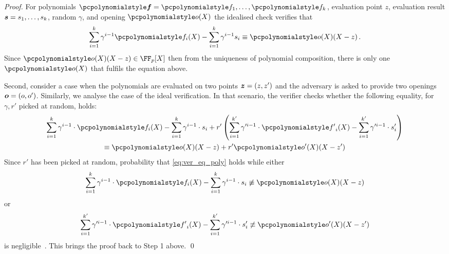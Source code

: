 \documentclass[runningheads,11pt]{llncs}
\let\spvec\vec
\let\vec\accentvec
\let\spvec\vec
\let\vec\spvec
\def\vec#1{\mathchoice{\mbox{\boldmath$\displaystyle#1$}}
  {\mbox{\boldmath$\textstyle#1$}} {\mbox{\boldmath$\scriptstyle#1$}}
  {\mbox{\boldmath$\scriptscriptstyle#1$}}}
\begin{document}
\begin{proof}
For polynomials $\vec{\p{f}} = \p{f}_1, \ldots, \p{f}_k$, evaluation point $z$, evaluation
result $\vec{s} = s_1, \ldots, s_k$, random $\gamma$, and opening $\p{o}(X)$ the
idealised check verifies that
\begin{equation}
	\sum_{i = 1}^k \gamma^{i - 1} \p{f}_i(X) - \sum_{i = 1}^{k} \gamma^{i - 1} s_i \equiv \p{o}(X) (X - z)\,.
	\label{eq:pcom_idealised_check}
\end{equation}
Since $\p{o}(X)(X - z) \in \FF_p[X]$ then from the uniqueness of polynomial
composition, there is only one $\p{o} (X)$ that fulfils the equation above.

 Second, consider a case when the polynomials are evaluated on two
points $\vec{z} = (z, z')$ and the adversary is asked to provide two openings
$\vec{o} = (o, o')$. Similarly, we analyse the case of the ideal verification.
In that scenario, the verifier checks whether the following equality, for
$\gamma, r'$ picked at random, holds:
\begin{multline}
	\label{eq:ver_eq_poly}
	\sum_{i = 1}^{k} \gamma^{i - 1} \cdot \p{f}_i(X) - \sum_{i = 1}^{k} \gamma^{i - 1} \cdot s_i  + r' \left(\sum_{i = 1}^{k'} \gamma'^{i - 1} \cdot \p{f'}_i(X) - \sum_{i = 1}^{k'} \gamma'^{i - 1} \cdot s'_i \right)\\
	\equiv \p{o}(X)(X - z) + r' \p{o}'(X)(X- z')
\end{multline}
Since $r'$ has been picked at random, probability that \cref{eq:ver_eq_poly} holds while either
\[
	\sum_{i = 1}^{k} \gamma^{i - 1} \cdot \p{f}_i(X) - \sum_{i = 1}^{k}  \gamma^{i - 1} \cdot s_i \not\equiv \p{o}(X)(X - z)
\]
or 
\[
	\sum_{i = 1}^{k'} \gamma'^{i - 1} \cdot \p{f'}_i(X) - \sum_{i = 1}^{k'} \gamma'^{i - 1} \cdot s'_i \not\equiv \p{o'}(X)(X - z')
\]
is negligible~\cite{EPRINT:GabWilCio19}. This brings the proof back to
Step 1 above. \qed
\end{proof}
\end{document}
